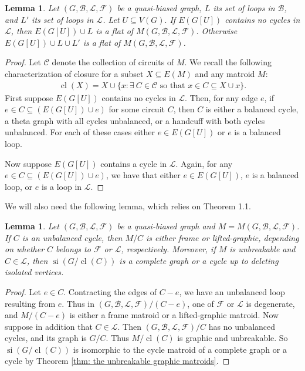 \documentclass[12pt]{article}
\newtheorem{lemma}[theorem]{Lemma}
\theoremstyle{definition}
\theoremstyle{plain} %
\newcommand{\cB}{\mathcal{B}}
\newcommand{\cC}{\mathcal{C}}
\newcommand{\cF}{\mathcal{F}}
\newcommand{\cL}{\mathcal{L}}
\DeclareMathOperator{\si}{si}
\DeclareMathOperator{\cl}{cl}
\newcommand{\qbg}{\ensuremath{(G,\cB,\cL,\cF)}}
\begin{document}
\begin{lemma}\label{lem: vertex induced flats}
Let $(G, \cB, \cL, \cF)$ be a quasi-biased graph, $L$ its set of loops in $\cB$, and $L'$ its set of loops in $\cL$. Let $U\subseteq V(G).$ If $E(G[U])$ contains no cycles in $\cL$, then $E(G[U]) \cup L$ is a flat of $M(G,\cB,\cL,\cF)$. Otherwise $E(G[U])\cup L\cup L'$ is a flat of $M(G,\cB,\cL,\cF)$.
\end{lemma}
\begin{proof}
    Let $\cC$ denote the collection of circuits of $M$. We recall the following characterization of closure for a subset $X\subseteq E(M)$ and any matroid $M$: 
    \begin{align*}
        \cl(X)=X\cup\{x:\exists \ C\in\cC \text{ so that }x\in C\subseteq X\cup x\}. 
    \end{align*}
    First suppose $E(G[U])$ contains no cycles in $\cL$. Then, for any edge $e$, if $e\in C\subseteq (E(G[U])\cup e)$ for some circuit $C$, then $C$ is either a balanced cycle, a theta graph with all cycles unbalanced, or a handcuff with both cycles unbalanced. For each of these cases either $e\in E(G[U])$ or $e$ is a balanced loop.

    Now suppose $E(G[U])$ contains a cycle in $\cL$. Again, for any $e\in C\subseteq (E(G[U])\cup e)$, we have that either $e\in E(G[U])$, $e$ is a balanced loop, or $e$ is a loop in $\cL$.
\end{proof}

We will also need the following lemma, which relies on Theorem 1.1.

\begin{lemma} \label{lem: contract a cycle}
Let $\qbg$ be a quasi-biased graph and $M=M\qbg$. If $C$ is an unbalanced cycle, then $M/C$ is either frame or lifted-graphic, depending on whether $C$ belongs to $\cF$ or $\cL$, respectively. Moreover, if $M$ is unbreakable and  $C\in \cL$, then $\si(G/\cl(C))$ is a complete graph or a cycle up to deleting isolated vertices.
\end{lemma}
\begin{proof}
Let $e\in C$. Contracting the edges of $C-e$, we have an unbalanced loop resulting from $e$. Thus in $\qbg/(C-e)$, one of $\cF$ or $\cL$ is degenerate, and $M/(C-e)$ is either a frame matroid or a lifted-graphic matroid. Now suppose in addition that $C\in \cL$. Then $(G, \cB, \cL, \cF)/C$ has no unbalanced cycles, and its graph is $G/C$. Thus $M/\cl(C)$ is graphic and unbreakable. 
So $\si(G/\cl(C))$ is isomorphic to the cycle matroid of a complete graph or a cycle by Theorem \ref{thm: the unbreakable graphic matroids}.  
\end{proof}
\end{document}
